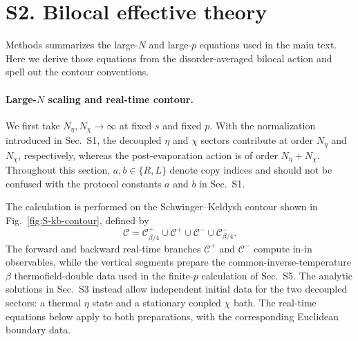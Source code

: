 \documentclass[11pt,a4paper]{article}
\begin{document}
\section*{S2. Bilocal effective theory}

\noindent
Methods summarizes the large-\(N\) and large-\(p\) equations used in the main
text. Here we derive those equations from the disorder-averaged bilocal action
and spell out the contour conventions.

\paragraph*{Large-\(N\) scaling and real-time contour.}

We first take \(N_\eta,N_\chi\to\infty\) at fixed \(s\) and fixed \(p\).
With the normalization introduced in Sec.~S1, the decoupled \(\eta\) and
\(\chi\) sectors contribute at order \(N_\eta\) and \(N_\chi\), respectively,
whereas the post-evaporation action is of order \(N_\eta+N_\chi\). Throughout
this section, \(a,b\in\{R,L\}\) denote copy indices and should not be confused
with the protocol constants \(a\) and \(b\) in Sec.~S1.

The calculation is performed on the Schwinger--Keldysh contour shown in
Fig.~\ref{fig:S-kb-contour}, defined by
\begin{equation}
\mathcal C
=
\mathcal C^+_{\beta/4}
\cup
\mathcal C^+
\cup
\mathcal C^-
\cup
\mathcal C^-_{\beta/4}.
\label{eq:S-kb-contour}
\end{equation}
The forward and backward real-time branches \(\mathcal C^+\) and
\(\mathcal C^-\) compute in-in observables, while the vertical segments
prepare the common-inverse-temperature \(\beta\) thermofield-double data
used in the finite-\(p\) calculation of Sec.~S5. The analytic solutions in
Sec.~S3 instead allow independent initial data for the two decoupled sectors:
a thermal \(\eta\) state and a stationary coupled \(\chi\) bath. The
real-time equations below apply to both preparations, with the corresponding
Euclidean boundary data.
\end{document}
